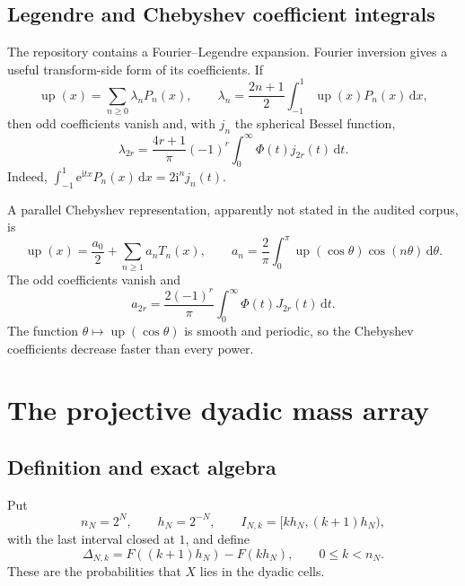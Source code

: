 \documentclass[11pt,oneside]{article}
\theoremstyle{definition}
\theoremstyle{remark}
\newcommand{\Up}{\operatorname{up}}
\newcommand{\e}{\mathrm e}
\newcommand{\ii}{\mathrm i}
\newcommand{\dd}{\,\mathrm d}
\begin{document}
\subsection{Legendre and Chebyshev coefficient integrals}

The repository contains a Fourier--Legendre expansion.  Fourier inversion gives
a useful transform-side form of its coefficients.  If
\begin{equation}\label{eq:Legendre-expansion}
 \Up(x)=\sum_{n\ge0}\lambda_nP_n(x),
 \qquad
 \lambda_n=\frac{2n+1}{2}\int_{-1}^1\Up(x)P_n(x)\dd x,
\end{equation}
then odd coefficients vanish and, with $j_n$ the spherical Bessel function,
\begin{equation}\label{eq:Legendre-Bessel}
 \lambda_{2r}=\frac{4r+1}{\pi}(-1)^r
 \int_0^\infty\Phi(t)j_{2r}(t)\dd t.
\end{equation}
Indeed,
$\int_{-1}^1\e^{\ii tx}P_n(x)\dd x=2\ii^n j_n(t)$.

A parallel Chebyshev representation, apparently not stated in the audited
corpus, is
\begin{equation}\label{eq:Chebyshev-expansion}
 \Up(x)=\frac{a_0}{2}+\sum_{n\ge1}a_nT_n(x),
 \qquad
 a_n=\frac2\pi\int_0^\pi\Up(\cos\theta)\cos(n\theta)\dd\theta.
\end{equation}
The odd coefficients vanish and
\begin{equation}\label{eq:Chebyshev-Bessel}
 a_{2r}=\frac{2(-1)^r}{\pi}
 \int_0^\infty\Phi(t)J_{2r}(t)\dd t.
\end{equation}
The function $\theta\mapsto\Up(\cos\theta)$ is smooth and periodic, so the
Chebyshev coefficients decrease faster than every power.

\section{The projective dyadic mass array}
\label{sec:dyadic-masses}

\subsection{Definition and exact algebra}

Put
\begin{equation}\label{eq:nN-hN}
 n_N=2^N,
 \qquad h_N=2^{-N},
 \qquad I_{N,k}=[kh_N,(k+1)h_N),
\end{equation}
with the last interval closed at $1$, and define
\begin{equation}\label{eq:Delta-def}
 \Delta_{N,k}
 =F((k+1)h_N)-F(kh_N),
 \qquad 0\le k<n_N.
\end{equation}
These are the probabilities that $X$ lies in the dyadic cells.
\end{document}
